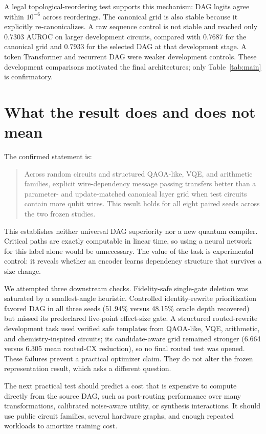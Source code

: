 \documentclass[10pt,twocolumn]{article}
\begin{document}
A legal topological-reordering test supports this mechanism: DAG logits agree within $10^{-6}$ across reorderings. The canonical grid is also stable because it explicitly re-canonicalizes. A raw sequence control is not stable and reached only 0.7303 AUROC on larger development circuits, compared with 0.7687 for the canonical grid and 0.7933 for the selected DAG at that development stage. A token Transformer and recurrent DAG were weaker development controls. These development comparisons motivated the final architectures; only Table~\ref{tab:main} is confirmatory.

\section{What the result does and does not mean}

The confirmed statement is:

\begin{quote}
Across random circuits and structured QAOA-like, VQE, and arithmetic families, explicit wire-dependency message passing transfers better than a parameter- and update-matched canonical layer grid when test circuits contain more qubit wires. This result holds for all eight paired seeds across the two frozen studies.
\end{quote}

This establishes neither universal DAG superiority nor a new quantum compiler. Critical paths are exactly computable in linear time, so using a neural network for this label alone would be unnecessary. The value of the task is experimental control: it reveals whether an encoder learns dependency structure that survives a size change.

We attempted three downstream checks. Fidelity-safe single-gate deletion was saturated by a smallest-angle heuristic. Controlled identity-rewrite prioritization favored DAG in all three seeds (51.94\% versus 48.15\% oracle depth recovered) but missed its predeclared five-point effect-size gate. A structured routed-rewrite development task used verified safe templates from QAOA-like, VQE, arithmetic, and chemistry-inspired circuits; its candidate-aware grid remained stronger (6.664 versus 6.305 mean routed-CX reduction), so no final routed test was opened. These failures prevent a practical optimizer claim. They do not alter the frozen representation result, which asks a different question.

The next practical test should predict a cost that is expensive to compute directly from the source DAG, such as post-routing performance over many transformations, calibrated noise-aware utility, or synthesis interactions. It should use public circuit families, several hardware graphs, and enough repeated workloads to amortize training cost.
\end{document}
